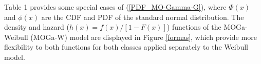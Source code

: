 \documentclass[twoside,leqno,11pt]{article}
\begin{document}
Table 1 provides some special cases of (\ref{PDF_MO-Gamma-G}), where $\Phi(x)$ and $\phi(x)$ are the CDF and PDF of the standard normal distribution. The density and hazard ($h(x) = f(x)/[1-F(x)]$) functions of the MOGa-Weibull (MOGa-W) model 
are displayed in Figure \ref{formas}, which provide more flexibility to both functions for both classes applied separately to the Weibull model. 

\vspace{0.6cm}

\end{document}

